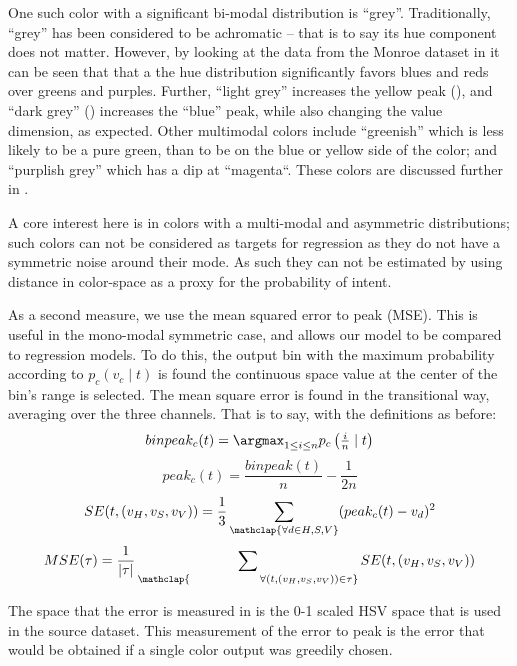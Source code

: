 


One such color with a significant bi-modal distribution is ``grey''.
Traditionally, ``grey'' has been considered to be achromatic -- that is to say its hue component does not matter.
However, by looking at the data from the Monroe dataset \parencite{Monroe2010XKCDdataset} in  it can be seen that that a the hue distribution significantly favors blues and reds over greens and purples.
Further, ``light grey'' increases the yellow peak (), and ``dark grey'' () increases the ``blue'' peak, while also changing the value dimension, as expected.
Other multimodal colors include ``greenish'' which is less likely to be a pure green, than to be on the blue or yellow side of the color; 
and ``purplish grey'' which has a dip at ``magenta``.
These colors are discussed further in .

A core interest here is in colors with a multi-modal and asymmetric distributions; such colors can not be considered as targets for regression as they do not have a symmetric noise around their mode.
As such they can not be estimated by using distance in color-space as a proxy for the probability of intent.




As a second measure, we use the mean squared error to peak (MSE).
This is useful in the mono-modal symmetric case, and allows our model to be compared to regression models.
To do this, the output bin with the maximum probability according to $p_c(v_c\mid t)$ is found the continuous space value at the center of the bin's range is selected.
The mean square error is found in the transitional way, averaging over the three channels.
That is to say, with the definitions as before:
\[
binpeak_c(t)=\argmax_{1\le i \le n}{p_c\left(\tfrac{i}{n} \mid t\right)}
\]
\[
peak_c(t)=\frac{binpeak(t)}{n} - \frac{1}{2n}
\]
\[
SE(t, (v_{H}, v_{S}, v_{V})) = \frac{1}{3}
	\sum_{\mathclap{\forall d\in{H,S,V}}} (peak_c(t) - v_d)^2
\]
\[
MSE(\tau) =\frac{1}{|\tau|}
	\sum_{\mathclap{\qquad\qquad\quad
		\forall(t,(v_{H}, v_{S}, v_{V})) \in \tau}}
	 SE(t,(v_{H}, v_{S}, v_{V}))
\]

The space that the error is measured in is the 0-1 scaled HSV space that is used in the source dataset.
This measurement of the error to peak is the error that would be obtained if a single color output was greedily chosen.


